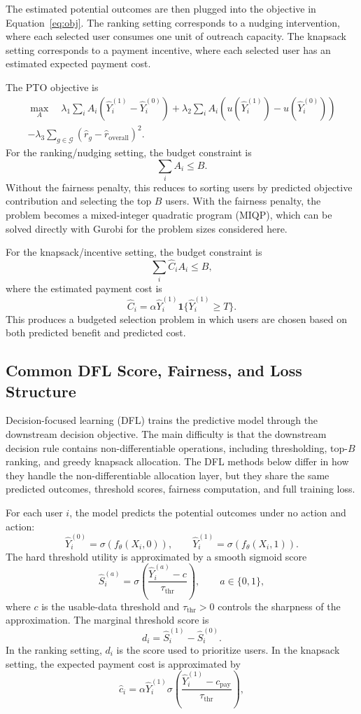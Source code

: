The estimated potential outcomes are then plugged into the objective in Equation~\ref{eq:obj}. The ranking setting corresponds to a nudging intervention, where each selected user consumes one unit of outreach capacity. The knapsack setting corresponds to a payment incentive, where each selected user has an estimated expected payment cost.

The PTO objective is
\begin{multline} \label{eq:obj_pto}
\max_A
\quad
\lambda_1 \sum_i A_i \left(\hat{Y}_i^{(1)} - \hat{Y}_i^{(0)}\right)
+ \lambda_2 \sum_i A_i \left(u(\hat{Y}_i^{(1)}) - u(\hat{Y}_i^{(0)})\right) \\
- \lambda_3 \sum_{g \in \mathcal{G}} \left(\hat{r}_g - \hat{r}_{\text{overall}}\right)^2 .
\end{multline}
For the ranking/nudging setting, the budget constraint is
\[
\sum_i A_i \le B.
\]
Without the fairness penalty, this reduces to sorting users by predicted objective contribution and selecting the top $B$ users. With the fairness penalty, the problem becomes a mixed-integer quadratic program (MIQP), which can be solved directly with Gurobi for the problem sizes considered here.

For the knapsack/incentive setting, the budget constraint is
\[
\sum_i \hat{C}_i A_i \le B,
\]
where the estimated payment cost is
\[
\hat{C}_i
=
\alpha \hat{Y}_i^{(1)}\mathbf{1}\{\hat{Y}_i^{(1)} \ge T\}.
\]
This produces a budgeted selection problem in which users are chosen based on both predicted benefit and predicted cost.

\subsection{Common DFL Score, Fairness, and Loss Structure}
Decision-focused learning (DFL) trains the predictive model through the downstream decision objective. The main difficulty is that the downstream decision rule contains non-differentiable operations, including thresholding, top-$B$ ranking, and greedy knapsack allocation. The DFL methods below differ in how they handle the non-differentiable allocation layer, but they share the same predicted outcomes, threshold scores, fairness computation, and full training loss.

For each user $i$, the model predicts the potential outcomes under no action and action:
\[
\hat{Y}_i^{(0)} = \sigma(f_\theta(X_i,0)),
\qquad
\hat{Y}_i^{(1)} = \sigma(f_\theta(X_i,1)).
\]
The hard threshold utility is approximated by a smooth sigmoid score
\[
\hat{S}_i^{(a)}
=
\sigma\!\left(
\frac{\hat{Y}_i^{(a)} - c}{\tau_{\text{thr}}}
\right),
\qquad a \in \{0,1\},
\]
where $c$ is the usable-data threshold and $\tau_{\text{thr}}>0$ controls the sharpness of the approximation. The marginal threshold score is
\[
d_i = \hat{S}_i^{(1)} - \hat{S}_i^{(0)}.
\]
In the ranking setting, $d_i$ is the score used to prioritize users. In the knapsack setting, the expected payment cost is approximated by
\[
\hat{c}_i
=
\alpha \hat{Y}_i^{(1)}
\sigma\!\left(
\frac{\hat{Y}_i^{(1)} - c_{\text{pay}}}{\tau_{\text{thr}}}
\right),
\]

